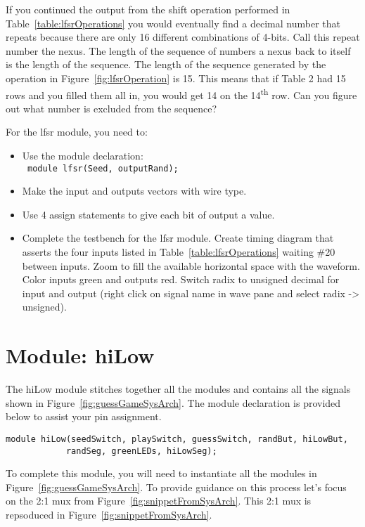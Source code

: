 If you continued the output from the shift operation performed in Table~\ref{table:lfsrOperations}
you would eventually find a decimal number that repeats because there
are only 16 different combinations of 4-bits. Call this repeat number
the nexus. The length of the sequence of numbers a nexus back to itself
is the length of the sequence. The length of the sequence generated by
the operation in Figure~\ref{fig:lfsrOperation} is 15. This means that if Table 2 had 15 rows
and you filled them all in, you would get 14 on the
14\textsuperscript{th} row. Can you figure out what number is excluded
from the sequence?

For the lfsr module, you need to:

\begin{itemize}
\item
Use the module declaration:\\
\verb+ module lfsr(Seed, outputRand);+

\item
Make the input and outputs vectors with wire type.
\item
\protect\hypertarget{lfsr_verilog}{}{}Use 4 assign statements to give
each bit of output a value.
\item
\protect\hypertarget{lfsr_testbench}{}{}Complete the testbench for the
lfsr module. Create timing diagram that asserts the four inputs listed
in Table~\ref{table:lfsrOperations}
waiting \#20 between inputs. Zoom to fill the available
horizontal space with the waveform. Color inputs green and outputs
red. Switch radix to unsigned decimal for input and output (right
    click on signal name in wave pane and select radix -\textgreater{}
unsigned).
\end{itemize}

\section{Module: hiLow}

The hiLow module stitches together all the modules and contains all
the signals shown in
Figure~\ref{fig:guessGameSysArch}. The module declaration is provided
below to assist your pin assignment.

\begin{verbatim}
module hiLow(seedSwitch, playSwitch, guessSwitch, randBut, hiLowBut,
            randSeg, greenLEDs, hiLowSeg);
\end{verbatim}

To complete this module, you will need to instantiate all the modules in
Figure~\ref{fig:guessGameSysArch}. To provide guidance on this process
let's focus on the 2:1 mux from Figure~\ref{fig:snippetFromSysArch}.  This
2:1 mux is repsoduced in Figure~\ref{fig:snippetFromSysArch}.

